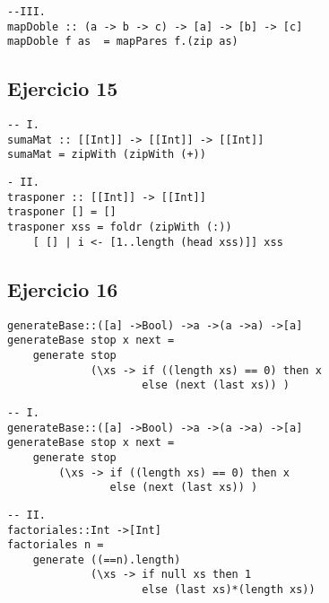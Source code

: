 \documentclass[10pt,a4paper]{article}
\begin{document}
\begin{centrado}
\begin{verbatim}
--III.
mapDoble :: (a -> b -> c) -> [a] -> [b] -> [c]
mapDoble f as  = mapPares f.(zip as)
\end{verbatim}
\end{centrado}

	
\subsection{Ejercicio 15}
\begin{centrado}
\begin{verbatim}
-- I.
sumaMat :: [[Int]] -> [[Int]] -> [[Int]]
sumaMat = zipWith (zipWith (+))
\end{verbatim}
\end{centrado}

\begin{centrado}
    \begin{verbatim}
- II.
trasponer :: [[Int]] -> [[Int]]
trasponer [] = []
trasponer xss = foldr (zipWith (:)) 
    [ [] | i <- [1..length (head xss)]] xss
    \end{verbatim}
\end{centrado}

\subsection{Ejercicio 16}
\begin{centrado}
    \begin{verbatim}
generateBase::([a] ->Bool) ->a ->(a ->a) ->[a]
generateBase stop x next = 
    generate stop 
             (\xs -> if ((length xs) == 0) then x 
                     else (next (last xs)) ) 
    \end{verbatim}
\end{centrado}

\begin{centrado}
    \begin{verbatim}
-- I.
generateBase::([a] ->Bool) ->a ->(a ->a) ->[a]
generateBase stop x next = 
    generate stop 
        (\xs -> if ((length xs) == 0) then x 
                else (next (last xs)) ) 
    \end{verbatim}
\end{centrado}

\begin{centrado}
    \begin{verbatim}
-- II.
factoriales::Int ->[Int]
factoriales n = 
    generate ((==n).length)
             (\xs -> if null xs then 1
                     else (last xs)*(length xs))
    \end{verbatim}
\end{centrado}
\end{document}
